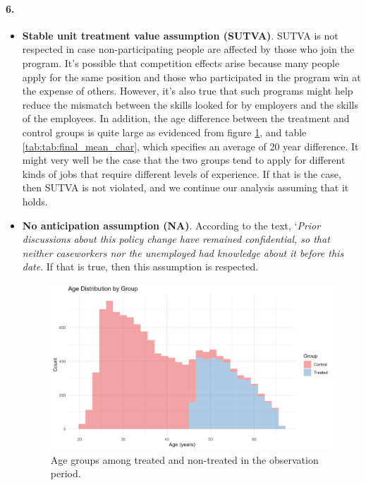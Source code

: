 \documentclass{scrartcl}
\begin{document}
\paragraph*{6.}

\begin{itemize}[label=$\blacktriangleright$]
    \item \textbf{Stable unit treatment value assumption (SUTVA)}. SUTVA is not respected in case non-participating people are affected by those who join the program. It's possible that competition effects arise because many people apply for the same position and those who participated in the program win at the expense of others. However, it's also true that such programs might help reduce the mismatch between the skills looked for by employers and the skills of the employees. In addition, the age difference between the treatment and control groups is quite large as evidenced from figure \ref{fig:age_hist}, and table \ref{tab:tab:final_mean_char}, which specifies an average of 20 year difference. It might very well be the case that the two groups tend to apply for different kinds of jobs that require different levels of experience. If that is the case, then SUTVA is not violated, and we continue our analysis assuming that it holds.\

    \item \textbf{No anticipation assumption (NA)}. According to the text, `\textit{Prior discussions about this policy change have remained confidential, so that neither caseworkers nor the unemployed had knowledge about it before this date}. If that is true, then this assumption is respected. \

        \begin{figure}
            \centering
            \includegraphics[width=0.75\linewidth]{output/figures/final_histogram_age.jpg}
            \caption{Age groups among treated and non-treated in the observation period.}
            \label{fig:age_hist}
        \end{figure}


\end{itemize}
\end{document}
